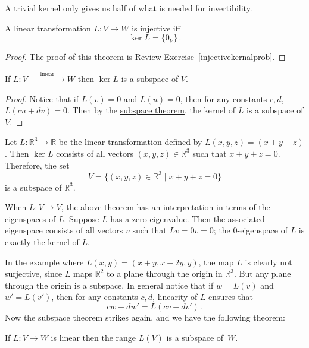 A trivial kernel only gives us half of what is needed for invertibility.




\begin{theorem}
A linear transformation $L\colon V\rightarrow W$ is injective iff \[\ker L=\{0_V\}\, .\]
\end{theorem}

\begin{proof}
The proof of this theorem is Review Exercise~\ref{injectivekernalprob}.
\end{proof}



\begin{theorem}
If $L \colon V\stackrel{\textrm{linear}}{-\!\!\!-\!\!\!-\!\!\!\rightarrow} W$  then $\ker L$ is a subspace of $V$.
\end{theorem}

\begin{proof}
Notice that if $L(v)=0$ and $L(u)=0$, then for any constants $c,d$, $L(cu+dv)=0$.  Then by the \hyperref[subspacetheorem]{subspace theorem}, the kernel of $L$ is a subspace of $V$.
\end{proof}

\begin{example}
Let \(L \colon \mathbb{R}^3 \to \mathbb{R}\) be the linear transformation defined by \(L(x,y,z)=(x+y+z)\). Then \(\ker L\) consists of all vectors \((x,y,z) \in \mathbb{R}^3\) such that \(x+y+z=0\). Therefore, the set
\[
V=\{(x,y,z) \in \mathbb{R}^3 \mid x+y+z=0\}
\]
is a subspace of \(\mathbb{R}^3\).
\end{example}

When $L:V\to V$, the above theorem has an interpretation in terms of the eigenspaces of $L$. Suppose $L$ has a zero eigenvalue.  Then the associated eigenspace consists of all vectors $v$ such that $Lv=0v=0$; the $0$-eigenspace of $L$ is exactly the kernel of $L$.  



In the example where $L(x,y)=(x+y,x+2y,y)$, the map $L$ is clearly not surjective, since $L$ maps $\mathbb{R}^2$ to a plane through the origin in $\mathbb{R}^3$. But any plane through the origin is a subspace. In general notice 
that if $w=L(v)$ and $w'=L(v')$, then for any constants $c,d$, linearity of $L$ ensures that \[cw+dw' = L(cv+dv')\, .\]  Now the subspace theorem strikes again, and we have the following theorem:

\begin{theorem}
If $L \colon V\rightarrow W$ is linear then the range $L(V)$ is a subspace of~$W$.
\end{theorem}


